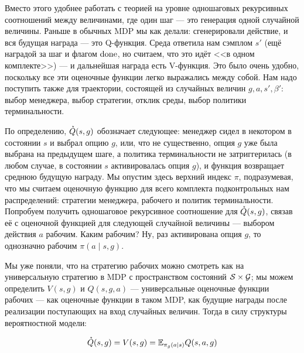Вместо этого удобнее работать с теорией на уровне одношаговых рекурсивных соотношений между величинами, где один шаг --- это генерация одной случайной величины. Раньше в обычных MDP мы как делали: сгенерировали действие, и вся будущая награда --- это Q-функция. Среда ответила нам сэмплом $s'$ (ещё наградой за шаг и флагом $\mathrm{done}$, но считаем, что это идёт <<в одном комплекте>>) --- и дальнейшая награда есть V-функция. Это было очень удобно, поскольку все эти оценочные функции легко выражались между собой. Нам надо поступить также для траектории, состоящей из случайных величин $g, a, s', \beta'$: выбор менеджера, выбор стратегии, отклик среды, выбор политики терминальности.

По определению, $\accentset{\star}{Q}(s, g)$ обозначает следующее: менеджер сидел в некотором в состоянии $s$ и выбрал опцию $g$, или, что не существенно, опция $g$ уже была выбрана на предыдущем шаге, а политика терминальности не затриггерилась (в любом случае, в состоянии $s$ активировалась опция $g$), и функция возвращает среднюю будущую награду. Мы опустим здесь верхний индекс $\pi$, подразумевая, что мы считаем оценочную функцию для всего комплекта подконтрольных нам распределений: стратегии менеджера, рабочего и политик терминальности. Попробуем получить одношаговое рекурсивное соотношение для $\accentset{\star}{Q}(s, g)$, связав её с оценочной функцией для следующей случайной величины --- выбором действия $a$ рабочим. Каким рабочим? Ну, раз активирована опция $g$, то однозначно рабочим $\pi(a \mid s, g)$. 

Мы уже поняли, что на стратегию рабочих можно смотреть как на универсальную стратегию в MDP с пространством состояний $\mathcal{S} \times \mathcal{G}$; 
мы можем определить $V(s, g)$ и $Q(s, g, a)$ --- универсальные оценочные функции рабочих --- как оценочные функции в таком MDP, как будущие награды после реализации поступающих на вход случайных величин. Тогда в силу структуры вероятностной модели:
\begin{proposition}
\begin{equation}\label{managerQworkerVworkerQ}
\accentset{\star}{Q}(s, g) = V(s, g) = \mathbb{E}_{\pi_g(a \mid s)} Q(s, a, g)
\end{equation}
\end{proposition}

